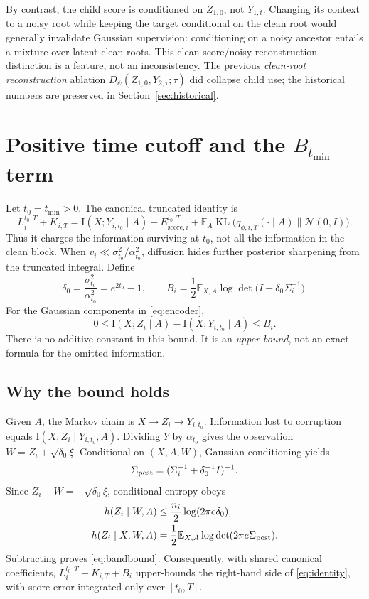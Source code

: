 \documentclass[10pt]{article}
\newcommand{\E}{\mathbb E}
\newcommand{\KL}{\operatorname{KL}}
\newcommand{\N}{\mathcal N}
\newcommand{\II}{\mathrm I}
\newcommand{\Score}[1]{E_{\mathrm{score},#1}}
\begin{document}
By contrast, the child score is conditioned on $Z_{1,0}$, not $Y_{1,t}$. Changing its context to a noisy root while keeping the target conditional on the clean root would generally invalidate Gaussian supervision: conditioning on a noisy ancestor entails a mixture over latent clean roots. This clean-score/noisy-reconstruction distinction is a feature, not an inconsistency. The previous \emph{clean-root reconstruction} ablation $D_\psi(Z_{1,0},Y_{2,\tau};\tau)$ did collapse child use; the historical numbers are preserved in Section~\ref{sec:historical}.

\newpage
\section{Positive time cutoff and the \texorpdfstring{$B_{t_{\min}}$}{B at t min} term}
Let $t_0=t_{\min}>0$. The canonical truncated identity is
\begin{equation}
L_i^{t_0:T}+K_{i,T}=\II(X;Y_{i,t_0}\mid A)+\Score{i}^{t_0:T}
+\E_A\KL\bigl(q_{\phi,i,T}(\cdot\mid A)\|\N(0,I)\bigr).
\label{eq:truncated}
\end{equation}
Thus it charges the information surviving at $t_0$, not all the information in the clean block. When $v_i\ll\sigma_{t_0}^2/\alpha_{t_0}^2$, diffusion hides further posterior sharpening from the truncated integral. Define
\begin{equation}
\delta_0=\frac{\sigma_{t_0}^2}{\alpha_{t_0}^2}=e^{2t_0}-1,\qquad
B_i=\frac12\E_{X,A}\log\det\bigl(I+\delta_0\Sigma_i^{-1}\bigr).
\label{eq:band}
\end{equation}
For the Gaussian components in \eqref{eq:encoder},
\begin{equation}
0\le\II(X;Z_i\mid A)-\II(X;Y_{i,t_0}\mid A)\le B_i.
\label{eq:bandbound}
\end{equation}
There is no additive constant in this bound. It is an \emph{upper bound}, not an exact formula for the omitted information.

\subsection{Why the bound holds}
Given $A$, the Markov chain is $X\to Z_i\to Y_{i,t_0}$. Information lost to corruption equals $\II(X;Z_i\mid Y_{i,t_0},A)$. Dividing $Y$ by $\alpha_{t_0}$ gives the observation $W=Z_i+\sqrt{\delta_0}\xi$. Conditional on $(X,A,W)$, Gaussian conditioning yields
\begin{equation}
\Sigma_{\rm post}=(\Sigma_i^{-1}+\delta_0^{-1}I)^{-1}.
\end{equation}
Since $Z_i-W=-\sqrt{\delta_0}\xi$, conditional entropy obeys
\begin{align}
h(Z_i\mid W,A)&\le\frac{n_i}{2}\log(2\pi e\delta_0),\\
h(Z_i\mid X,W,A)&=\frac12\E_{X,A}\log\det(2\pi e\Sigma_{\rm post}).
\end{align}
Subtracting proves \eqref{eq:bandbound}. Consequently, with shared canonical coefficients, $L_i^{t_0:T}+K_{i,T}+B_i$ upper-bounds the right-hand side of \eqref{eq:identity}, with score error integrated only over $[t_0,T]$.
\end{document}
